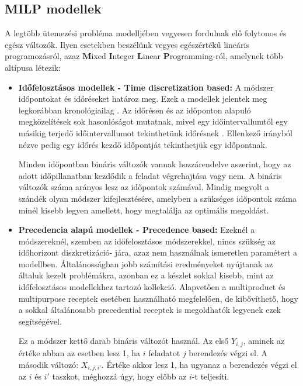 \subsection{MILP modellek}
A legtöbb ütemezési probléma modelljében vegyesen fordulnak elő folytonos és egész változók. Ilyen esetekben beszélünk vegyes egészértékű lineáris programozásról, azaz \textbf{M}ixed \textbf{I}nteger \textbf{L}inear \textbf{P}rogramming-ról, amelynek több altípusa létezik:
\begin{itemize}
  \item[] \textbf{Időfelosztásos modellek - Time discretization based:} A módszer időpontokat és időréseket határoz meg. Ezek a modellek jelentek meg legkorábban kronológiailag \cite{kondili}. Az időrésen és az időponton alapuló megközelítések sok hasonlóságot mutatnak, mivel egy időintervallumtól egy másikig terjedő időintervallumot tekinthetünk időrésnek \cite{susarla}. Ellenkező irányból nézve pedig egy időrés kezdő időpontját tekinthetjük egy időpontnak.  
  
  Minden időpontban bináris változók vannak hozzárendelve aszerint, hogy az adott időpillanatban kezdődik a feladat végrehajtása vagy nem. A bináris változók száma arányos lesz az időpontok számával. Mindig megvolt a szándék olyan módszer kifejlesztésére, amelyben a szükséges időpontok száma minél kisebb legyen amellett, hogy megtalálja az optimális megoldást. 
  
  \item[] \textbf{Precedencia alapú modellek - Precedence based:} Ezeknél a módszereknél, szemben az időfelosztásos módszerekkel, nincs szükség az időhorizont diszkretizáció- jára, azaz nem használnak ismeretlen paramétert a modellben. Általánosságban jobb számítási eredményeket nyújtanak az általuk kezelt problémákra, azonban ez a készlet sokkal kisebb, mint az időfelosztásos modellekhez tartozó kollekció. Alapvetően a multiproduct és multipurpose receptek esetében használható megfelelően, de kibővíthető, hogy a sokkal általánosabb precedential receptek is megoldhatók legyenek ezek segítségével. 
  
Ez a módszer kettő darab bináris változót használ. Az első $Y_{i,j}$, aminek az értéke abban az esetben lesz 1, ha $i$ feladatot $j$ berendezés végzi el. A második változó: $X_{i,j,i'}$. Értéke akkor lesz 1, ha ugyanaz a berendezés végzi el az $i$ és $i'$ taszkot, méghozzá úgy, hogy előbb az $i$-t teljesíti. 
\end{itemize}
